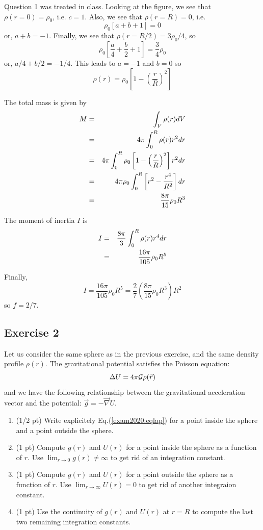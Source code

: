 Question 1 was treated in class.  
Looking at the figure, we see that $\rho(r=0)=\rho_0$, i.e. $c=1$.
Also, we see that $\rho(r=R)=0$, i.e.
\[
\rho_0 \left[ a +b + 1 \right] =0 
\]
or, $a+b=-1$.
Finally, we see that $\rho(r=R/2)=3\rho_0/4$, so
\[
\rho_0 \left[ \frac{a}{4} +\frac{b}{2} +1 \right] = \frac{3}{4}\rho_0
\]
or, $a/4 + b/2 = -1/4$.
This leads to $a=-1$ and $b=0$ so 
\[
\rho(r) = \rho_0 \left[ 1 - \left(\frac{r}{R}\right)^2  \right]
\]

The total mass is given by 
\begin{eqnarray}
M 
&=& \int_V \rho(r) dV \nonumber\\
&=&  4\pi \int_0^R  \rho(r) r^2 dr \nonumber\\
&=&  4\pi \int_0^R   \rho_0 \left[ 1 - \left(\frac{r}{R}\right)^2  \right]  r^2 dr \nonumber\\
&=&  4\pi \rho_0  \int_0^R   \left[ r^2 - \frac{r^4}{R^2}  \right]  dr \nonumber\\
&=& \frac{8 \pi}{15} \rho_0 R^3
\end{eqnarray}

The moment of inertia $I$ is 
\begin{eqnarray}
I 
&=&  \frac{8\pi}{3} \int_0^R  \rho(r) r^4 dr \nonumber\\
&=& \frac{16 \pi}{105} \rho_0 R^5
\end{eqnarray}

Finally, 
\[
I = \frac{16 \pi}{105} \rho_0 R^5 = \frac{2}{7} (\frac{8 \pi}{15} \rho_0 R^3) R^2
\]
so $f=2/7$.


\subsection*{Exercise 2}

Let us consider the same sphere as in the previous exercise, and the same density profile $\rho(r)$.
The gravitational potential satisfies the Poisson equation:
\begin{equation}
\Delta U = 4 \pi {\cal G} \rho({\vec r}) \label{exam2020:eqlap}
\end{equation}
and we have the following relationship between the gravitational acceleration 
vector and the potential: ${\vec g}=-{\vec \nabla} U$.

\begin{enumerate}
\item (1/2 pt) Write explicitely Eq.(\ref{exam2020:eqlap}) for a point inside the sphere and a point outside the sphere.
\item (1 pt) Compute $g(r)$ and $U(r)$ for a point inside the sphere as a function of $r$. Use 
$\lim_{r\rightarrow 0} g(r) \neq \infty$
to get rid of an integration constant.
\item (1 pt) Compute $g(r)$ and $U(r)$ for a point outside the sphere as a function of $r$. 
Use $\lim_{r\rightarrow\infty}U(r)=0$ to get rid of another integraion constant.
\item (1 pt) Use the continuity of $g(r)$ and $U(r)$ at $r=R$ 
to compute the last two remaining integration constants.
\end{enumerate}

